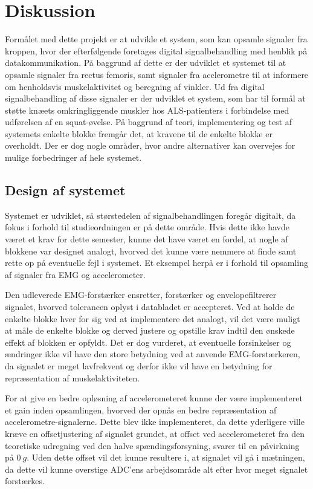 \section{Diskussion}
Formålet med dette projekt er at udvikle et system, som kan opsamle signaler fra kroppen, hvor der efterfølgende foretages digital signalbehandling med henblik på datakommunikation. På baggrund af dette er der udviklet et systemet til at opsamle signaler fra rectus femoris, samt signaler fra acclerometre til at informere om henholdsvis muskelaktivitet og beregning af vinkler. Ud fra digital signalbehandling af disse signaler er der udviklet et system, som har til formål at støtte knæets omkringliggende muskler hos ALS-patienters i forbindelse med udførelsen af en squat-øvelse. På baggrund af teori, implementering og test af systemets enkelte blokke fremgår det, at kravene til de enkelte blokke er overholdt. Der er dog nogle områder, hvor andre alternativer kan overvejes for mulige forbedringer af hele systemet. 

\subsection{Design af systemet}
Systemet er udviklet, så størstedelen af signalbehandlingen foregår digitalt, da fokus i forhold til studieordningen er på dette område. Hvis dette ikke havde været et krav for dette semester, kunne det have været en fordel, at nogle af blokkene var designet analogt, hvorved det kunne være nemmere at finde samt rette op på eventuelle fejl i systemet. Et eksempel herpå er i forhold til opsamling af signaler fra EMG og accelerometer. 

Den udleverede EMG-forstærker ensretter, forstærker og envelopefiltrerer signalet, hvorved tolerancen oplyst i databladet er accepteret. Ved at holde de enkelte blokke hver for sig ved at implementere det analogt, vil det være muligt at måle de enkelte blokke og derved justere og opstille krav indtil den ønskede effekt af blokken er opfyldt. Det er dog vurderet, at eventuelle forsinkelser og ændringer ikke vil have den store betydning ved at anvende EMG-forstærkeren, da signalet er meget lavfrekvent og derfor ikke vil have en betydning for repræsentation af muskelaktiviteten. 

For at give en bedre opløsning af accelerometeret kunne der være implementeret et gain inden opsamlingen, hvorved der opnås en bedre repræsentation af accelerometre-signalerne. Dette blev ikke implementeret, da dette yderligere ville kræve en offsetjustering af signalet grundet, at offset ved accelerometeret fra den teoretiske udregning ved den halve spændingsforsyning, svarer til en påvirkning på $0~g$. Uden dette offset vil det kunne resultere i, at signalet vil gå i mætningen, da dette vil kunne overstige ADC'ens arbejdsområde alt efter hvor meget signalet forstærkes. 

